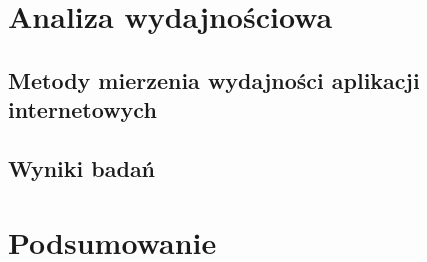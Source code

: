 \documentclass[mgr,oneside]{mgr}
\begin{document}
\chapter{Analiza wydajnościowa}
\label{cha:analiza_wydajnosciowa}
\section{Metody mierzenia wydajności aplikacji internetowych}
\section{Wyniki badań}

\chapter{Podsumowanie}
\renewcommand\bibname{Literatura}
\end{document}
